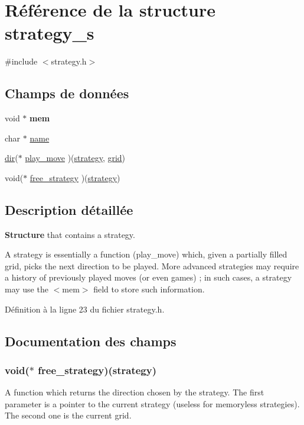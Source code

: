 \hypertarget{structstrategy__s}{
\section{Référence de la structure strategy\_\-s}
\label{structstrategy__s}
}


{\ttfamily \#include $<$strategy.h$>$}

\subsection*{Champs de données}
\begin{DoxyCompactItemize}
\item 
\hypertarget{structstrategy__s_a5f00e9b1b039412bb144bae39e66b97a}{
void $\ast$ {\bfseries mem}}
\label{structstrategy__s_a5f00e9b1b039412bb144bae39e66b97a}

\item 
char $\ast$ \hyperlink{structstrategy__s_a5ac083a645d964373f022d03df4849c8}{name}
\item 
\hyperlink{grid_8h_a862c63b15eab5b0d2781cea356e5d935}{dir}($\ast$ \hyperlink{structstrategy__s_ac4ec2cfabdd3e4b516c4164f83008809}{play\_\-move} )(\hyperlink{structstrategy__s}{strategy}, \hyperlink{structgrid__s}{grid})
\item 
void($\ast$ \hyperlink{structstrategy__s_a03f512455d12943d000c8287d130ac09}{free\_\-strategy} )(\hyperlink{structstrategy__s}{strategy})
\end{DoxyCompactItemize}


\subsection{Description détaillée}
{\bfseries Structure} that contains a strategy.

A strategy is essentially a function (play\_\-move) which, given a partially filled grid, picks the next direction to be played. More advanced strategies may require a history of previously played moves (or even games) ; in such cases, a strategy may use the $<$mem$>$ field to store such information. 

Définition à la ligne 23 du fichier strategy.h.



\subsection{Documentation des champs}
\hypertarget{structstrategy__s_a03f512455d12943d000c8287d130ac09}{
\subsubsection[{free\_\-strategy}]{\setlength{\rightskip}{0pt plus 5cm}void($\ast$ {\bf free\_\-strategy})({\bf strategy})}}
\label{structstrategy__s_a03f512455d12943d000c8287d130ac09}
A function which returns the direction chosen by the strategy. The first parameter is a pointer to the current strategy (useless for memoryless strategies). The second one is the current grid. 

